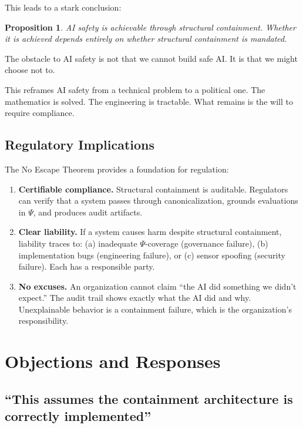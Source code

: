 \documentclass[12pt]{article}
\newtheorem{proposition}{Proposition}[section]
\theoremstyle{definition}
\begin{document}
This leads to a stark conclusion:

\begin{proposition}
AI safety is achievable through structural containment. Whether it is achieved depends entirely on whether structural containment is mandated.
\end{proposition}

The obstacle to AI safety is not that we cannot build safe AI. It is that we might choose not to.

This reframes AI safety from a technical problem to a political one. The mathematics is solved. The engineering is tractable. What remains is the will to require compliance.

\subsection{Regulatory Implications}

The No Escape Theorem provides a foundation for regulation:

\begin{enumerate}
    \item \textbf{Certifiable compliance.} Structural containment is auditable. Regulators can verify that a system passes through canonicalization, grounds evaluations in $\Psi$, and produces audit artifacts.
    \item \textbf{Clear liability.} If a system causes harm despite structural containment, liability traces to: (a) inadequate $\Psi$-coverage (governance failure), (b) implementation bugs (engineering failure), or (c) sensor spoofing (security failure). Each has a responsible party.
    \item \textbf{No excuses.} An organization cannot claim ``the AI did something we didn't expect.'' The audit trail shows exactly what the AI did and why. Unexplainable behavior is a containment failure, which is the organization's responsibility.
\end{enumerate}

\section{Objections and Responses}

\subsection{``This assumes the containment architecture is correctly implemented''}
\end{document}
